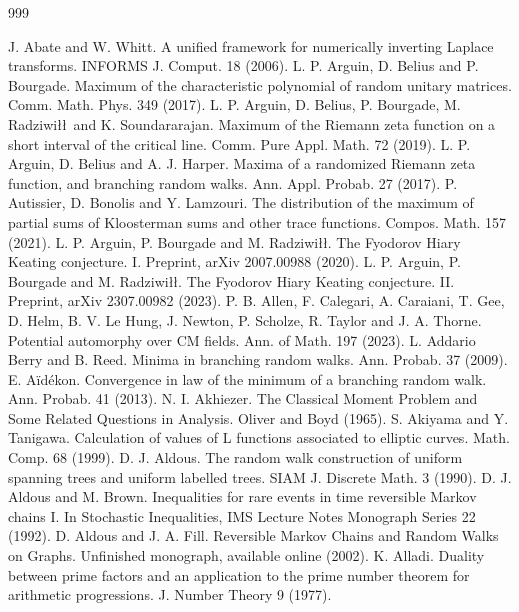 \begin{thebibliography}{999}
\small
{} J. Abate and W. Whitt. A unified framework for numerically inverting Laplace transforms. INFORMS J. Comput. 18 (2006).
 L. P. Arguin, D. Belius and P. Bourgade. Maximum of the characteristic polynomial of random unitary matrices. Comm. Math. Phys. 349 (2017).
 L. P. Arguin, D. Belius, P. Bourgade, M. Radziwi\l\l\ and K. Soundararajan. Maximum of the Riemann zeta function on a short interval of the critical line. Comm. Pure Appl. Math. 72 (2019).
 L. P. Arguin, D. Belius and A. J. Harper. Maxima of a randomized Riemann zeta function, and branching random walks. Ann. Appl. Probab. 27 (2017).
 P. Autissier, D. Bonolis and Y. Lamzouri. The distribution of the maximum of partial sums of Kloosterman sums and other trace functions. Compos. Math. 157 (2021).
 L. P. Arguin, P. Bourgade and M. Radziwi\l\l. The Fyodorov Hiary Keating conjecture. I. Preprint, arXiv 2007.00988 (2020).
 L. P. Arguin, P. Bourgade and M. Radziwi\l\l. The Fyodorov Hiary Keating conjecture. II. Preprint, arXiv 2307.00982 (2023).
 P. B. Allen, F. Calegari, A. Caraiani, T. Gee, D. Helm, B. V. Le Hung, J. Newton, P. Scholze, R. Taylor and J. A. Thorne. Potential automorphy over CM fields. Ann. of Math. 197 (2023).
 L. Addario Berry and B. Reed. Minima in branching random walks. Ann. Probab. 37 (2009).
 E. A\"id\'ekon. Convergence in law of the minimum of a branching random walk. Ann. Probab. 41 (2013).
 N. I. Akhiezer. The Classical Moment Problem and Some Related Questions in Analysis. Oliver and Boyd (1965).
 S. Akiyama and Y. Tanigawa. Calculation of values of L functions associated to elliptic curves. Math. Comp. 68 (1999).
 D. J. Aldous. The random walk construction of uniform spanning trees and uniform labelled trees. SIAM J. Discrete Math. 3 (1990).
 D. J. Aldous and M. Brown. Inequalities for rare events in time reversible Markov chains I. In Stochastic Inequalities, IMS Lecture Notes Monograph Series 22 (1992).
 D. Aldous and J. A. Fill. Reversible Markov Chains and Random Walks on Graphs. Unfinished monograph, available online (2002).
 K. Alladi. Duality between prime factors and an application to the prime number theorem for arithmetic progressions. J. Number Theory 9 (1977).

\end{thebibliography}
